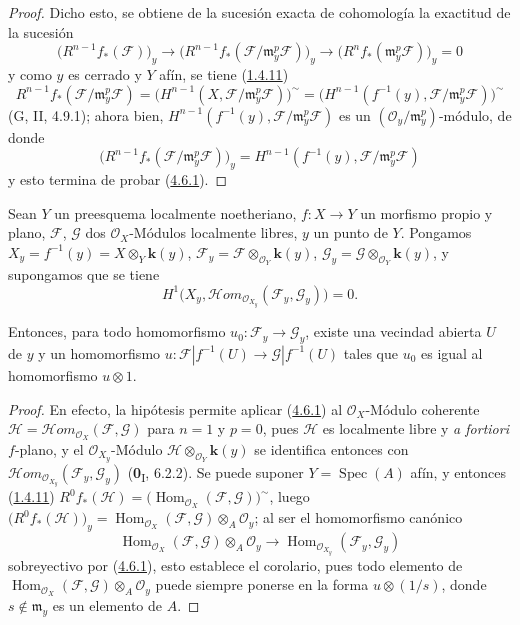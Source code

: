 \begin{proof}
Dicho esto, se obtiene de la sucesión exacta de cohomología la exactitud de la
sucesión
\[
\bigl(R^{n-1}f_*(\mathcal F)\bigr)_y
\longrightarrow
\bigl(R^{n-1}f_*(\mathcal F/\mathfrak m_y^p\mathcal F)\bigr)_y
\longrightarrow
\bigl(R^nf_*(\mathfrak m_y^p\mathcal F)\bigr)_y=0
\]
y como $y$ es cerrado y $Y$ afín, se tiene (\hyperref[III.1.4.11-fr]{1.4.11})
\[
R^{n-1}f_*(\mathcal F/\mathfrak m_y^p\mathcal F)
=\bigl(H^{n-1}(X,\mathcal F/\mathfrak m_y^p\mathcal F)\bigr)^\sim
=\bigl(H^{n-1}(f^{-1}(y),
\mathcal F/\mathfrak m_y^p\mathcal F)\bigr)^\sim
\]
(G, II, 4.9.1); ahora bien,
$H^{n-1}(f^{-1}(y),\mathcal F/\mathfrak m_y^p\mathcal F)$ es un
$(\mathcal O_y/\mathfrak m_y^p)$-módulo, de donde
\[
\bigl(R^{n-1}f_*(\mathcal F/\mathfrak m_y^p\mathcal F)\bigr)_y
=H^{n-1}(f^{-1}(y),\mathcal F/\mathfrak m_y^p\mathcal F)
\]
y esto termina de probar (\hyperref[III.4.6.1-fr]{4.6.1}).
\end{proof}

\begin{corollary}[4.6.2]
\label{III.4.6.2-fr}
Sean $Y$ un preesquema localmente noetheriano, $f:X\to Y$ un morfismo propio
y plano, $\mathcal F$, $\mathcal G$ dos $\mathcal O_X$-Módulos localmente
libres, $y$ un punto de $Y$. Pongamos
$X_y=f^{-1}(y)=X\otimes_Y\boldsymbol{k}(y)$,
$\mathcal F_y=\mathcal F\otimes_{\mathcal O_Y}\boldsymbol{k}(y)$,
$\mathcal G_y=\mathcal G\otimes_{\mathcal O_Y}\boldsymbol{k}(y)$,
y supongamos que se tiene
\[
\label{III.4.6.2.1-fr}
H^1\bigl(X_y,
\mathcal{H}\!om_{\mathcal O_{X_y}}(\mathcal F_y,\mathcal G_y)\bigr)=0.
\tag{4.6.2.1}
\]

Entonces, para todo homomorfismo $u_0:\mathcal F_y\to\mathcal G_y$, existe
una vecindad abierta $U$ de $y$ y un homomorfismo
$u:\mathcal F|f^{-1}(U)\longrightarrow\mathcal G|f^{-1}(U)$
tales que $u_0$ es igual al homomorfismo $u\otimes1$.
\end{corollary}

\begin{proof}
En efecto, la hipótesis permite aplicar (\hyperref[III.4.6.1-fr]{4.6.1}) al
$\mathcal O_X$-Módulo coherente
$\mathcal H=\mathcal{H}\!om_{\mathcal O_X}(\mathcal F,\mathcal G)$ para
$n=1$ y $p=0$, pues $\mathcal H$ es localmente libre y \emph{a fortiori}
$f$-plano, y el $\mathcal O_{X_y}$-Módulo
$\mathcal H\otimes_{\mathcal O_Y}\boldsymbol{k}(y)$ se identifica entonces con
$\mathcal{H}\!om_{\mathcal O_{X_y}}(\mathcal F_y,\mathcal G_y)$
(\textbf{0}\textsubscript{I}, 6.2.2). Se puede suponer $Y=\operatorname{Spec}(A)$
afín, y entonces (\hyperref[III.1.4.11-fr]{1.4.11})
$R^0f_*(\mathcal H)=
\bigl(\operatorname{Hom}_{\mathcal O_X}(\mathcal F,\mathcal G)\bigr)^\sim$,
luego
$\bigl(R^0f_*(\mathcal H)\bigr)_y
=\operatorname{Hom}_{\mathcal O_X}(\mathcal F,\mathcal G)
\otimes_A\mathcal O_y$;
al ser el homomorfismo canónico
\[
\operatorname{Hom}_{\mathcal O_X}(\mathcal F,\mathcal G)
\otimes_A\mathcal O_y
\longrightarrow
\operatorname{Hom}_{\mathcal O_{X_y}}(\mathcal F_y,\mathcal G_y)
\]
sobreyectivo por (\hyperref[III.4.6.1-fr]{4.6.1}), esto establece el
corolario, pues todo elemento de
$\operatorname{Hom}_{\mathcal O_X}(\mathcal F,\mathcal G)
\otimes_A\mathcal O_y$ puede siempre ponerse en la forma
$u\otimes(1/s)$, donde $s\notin\mathfrak m_y$ es un elemento de $A$.
\end{proof}


